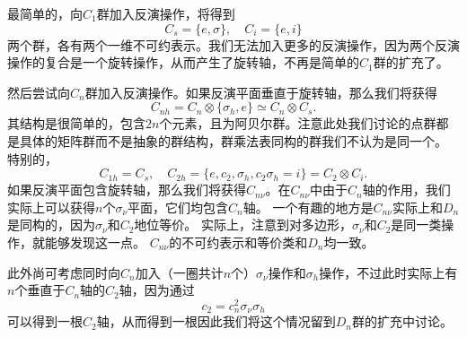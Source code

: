 最简单的，向$C_1$群加入反演操作，将得到
\begin{equation}
    C_s = \{e, \sigma \}, \quad C_i = \{e, i \}
\end{equation}
两个群，各有两个一维不可约表示。我们无法加入更多的反演操作，因为两个反演操作的复合是一个旋转操作，从而产生了旋转轴，不再是简单的$C_1$群的扩充了。

然后尝试向$C_n$群加入反演操作。如果反演平面垂直于旋转轴，那么我们将获得
\begin{equation}
    C_{nh} = C_n \otimes \{\sigma_h, e\} \simeq C_n \otimes C_s.
\end{equation}
其结构是很简单的，包含$2n$个元素，且为阿贝尔群。注意此处我们讨论的点群都是具体的矩阵群而不是抽象的群结构，群乘法表同构的群我们不认为是同一个。
特别的，
\begin{equation}
    C_{1h} = C_s, \quad C_{2h} = \{e, c_2, \sigma_h, c_2 \sigma_h = i\} = C_2 \otimes C_i.
\end{equation}
如果反演平面包含旋转轴，那么我们将获得$C_{n \nu}$。在$C_{n \nu}$中由于$C_n$轴的作用，我们实际上可以获得$n$个$\sigma_\nu$平面，它们均包含$C_n$轴。
一个有趣的地方是$C_{n \nu}$实际上和$D_n$是同构的，因为$\sigma_\nu$和$C_2$地位等价。
实际上，注意到对多边形，$\sigma_\nu$和$C_2$是同一类操作，就能够发现这一点。
$C_{n \nu}$的不可约表示和等价类和$D_n$均一致。

此外尚可考虑同时向$C_n$加入（一圈共计$n$个）$\sigma_\nu$操作和$\sigma_h$操作，不过此时实际上有$n$个垂直于$C_n$轴的$C_2$轴，因为通过
\[
    c_2 = c_n^2 \sigma_\nu \sigma_h
\]
可以得到一根$C_2$轴，从而得到一根因此我们将这个情况留到$D_n$群的扩充中讨论。

